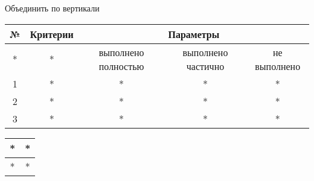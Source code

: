 \documentclass[12pt]{article}
\begin{document}
Объединить по вертикали

\begin{tabular}{|c|c|c|c|c|}
  \hline
  № & Критерии & \multicolumn{3}{|c|}{Параметры}\\
  \hline
  * & * & выполнено полностью & выполнено частично & не выполнено \\
  \hline
  1 & * & * & * & * \\
  \hline
  2 & * & * & * & * \\
  \hline
  3 & * & * & * & * \\
  \hline
\end{tabular}

\begin{tabular}{|c|c|}
  \hline
  * & * \\
  \hline
  * & * \\
  \hline
\end{tabular}
\end{document}
